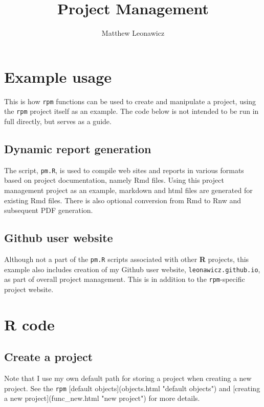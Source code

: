\documentclass{article}\usepackage[]{graphicx}\usepackage[]{color}
\begin{document}
\title{Project Management}
\author{Matthew Leonawicz}
\maketitle





\section{Example usage}
This is how \texttt{rpm} functions can be used to create and manipulate a project, using the \texttt{rpm} project itself as an example.
The code below is not intended to be run in full directly, but serves as a guide.

\subsection{Dynamic report generation}
The script, \texttt{pm.R}, is used to compile web sites and reports in various formats based on project documentation, namely Rmd files.
Using this project management project as an example, markdown and html files are generated for existing Rmd files.
There is also optional conversion from Rmd to Rnw and subsequent PDF generation.

\subsection{Github user website}
Although not a part of the \texttt{pm.R} scripts associated with other \textbf{R} projects,
this example also includes creation of my Github user website, \texttt{leonawicz.github.io}, as part of overall project management.
This is in addition to the \texttt{rpm}-specific project website.

\section{R code}

\subsection{Create a project}
Note that I use my own default path for storing a project when creating a new project.
See the \texttt{rpm} [default objects](objects.html "default objects") and [creating a new project](func\_new.html "new project") for more details.
\end{document}
